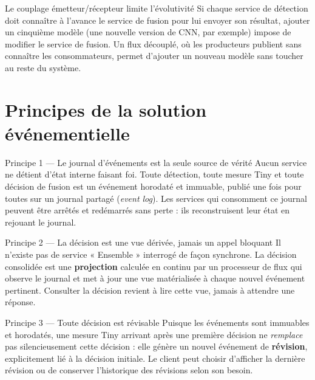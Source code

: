 \documentclass[11pt,a4paper]{article}
\begin{document}
\begin{probleme}{Le couplage émetteur/récepteur limite l'évolutivité}
Si chaque service de détection doit connaître à l'avance le service de fusion pour lui envoyer
son résultat, ajouter un cinquième modèle (une nouvelle version de CNN, par exemple) impose de
modifier le service de fusion. Un flux découplé, où les producteurs publient sans connaître les
consommateurs, permet d'ajouter un nouveau modèle sans toucher au reste du système.
\end{probleme}

\section{Principes de la solution événementielle}

\begin{principe}{Principe 1 --- Le journal d'événements est la seule source de vérité}
Aucun service ne détient d'état interne faisant foi. Toute détection, toute mesure Tiny et
toute décision de fusion est un événement horodaté et immuable, publié une fois pour toutes
sur un journal partagé (\emph{event log}). Les services qui consomment ce journal peuvent être
arrêtés et redémarrés sans perte : ils reconstruisent leur état en rejouant le journal.
\end{principe}

\begin{principe}{Principe 2 --- La décision est une vue dérivée, jamais un appel bloquant}
Il n'existe pas de service « Ensemble » interrogé de façon synchrone. La décision consolidée
est une \textbf{projection} calculée en continu par un processeur de flux qui observe le
journal et met à jour une vue matérialisée à chaque nouvel événement pertinent. Consulter la
décision revient à lire cette vue, jamais à attendre une réponse.
\end{principe}

\begin{principe}{Principe 3 --- Toute décision est révisable}
Puisque les événements sont immuables et horodatés, une mesure Tiny arrivant après une première
décision ne \emph{remplace} pas silencieusement cette décision : elle génère un nouvel
événement de \textbf{révision}, explicitement lié à la décision initiale. Le client peut choisir
d'afficher la dernière révision ou de conserver l'historique des révisions selon son besoin.
\end{principe}
\end{document}
